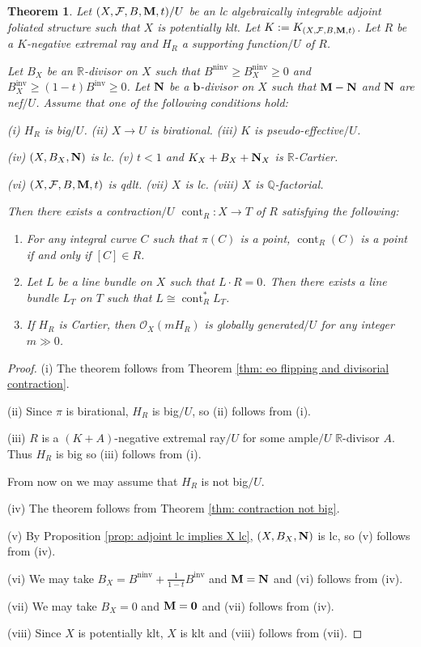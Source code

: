 \documentclass[12pt]{amsart}
\numberwithin{equation}{section}
\newcommand{\bb}{\bm{b}}
\newcommand{\Mm}{{\bf{M}}}
\newcommand{\Nn}{{\bf{N}}}
\newcommand{\Qq}{\mathbb{Q}}
\newcommand{\Rr}{\mathbb{R}}
\newcommand{\ninv}{\operatorname{ninv}}
\newcommand{\inv}{\operatorname{inv}}
\newcommand{\cont}{\operatorname{cont}}
\newcommand{\Ff}{\mathcal{F}}
\newtheorem{thm}{Theorem}[section]
\theoremstyle{definition}
\theoremstyle{definition}
\theoremstyle{definition}
\begin{document}
\begin{thm}\label{thm: contraction theorem strong}
    Let $(X,\Ff,B,\Mm,t)/U$ be an lc algebraically integrable adjoint foliated structure such that $X$ is potentially klt. Let $K:=K_{(X,\Ff,B,\Mm,t)}$. Let $R$ be a $K$-negative extremal ray and $H_R$ a supporting function$/U$ of $R$. 
    
    Let $B_X$ be an $\Rr$-divisor on $X$ such that $B^{\ninv}\geq B_X^{\ninv}\geq 0$ and $B_X^{\inv}\geq (1-t)B^{\inv}\geq 0$. Let $\Nn$ be a $\bb$-divisor on $X$ such that $\Mm-\Nn$ and $\Nn$ are nef$/U$. Assume that one of the following conditions hold:

(i) $H_R$ is big$/U$. (ii) $X\rightarrow U$ is birational. (iii) $K$ is pseudo-effective$/U$. 

(iv) $(X,B_X,\Nn)$ is lc. (v) $t<1$ and $K_X+B_X+\Nn_X$ is $\Rr$-Cartier.  

(vi) $(X,\Ff,B,\Mm,t)$ is qdlt. (vii) $X$ is lc. (viii) $X$ is $\Qq$-factorial. 

\noindent Then there exists a contraction$/U$ $\cont_R: X\rightarrow T$ of $R$ satisfying the following:
\begin{enumerate}
    \item For any integral curve $C$ such that $\pi(C)$ is a point, $\cont_R(C)$ is a point if and only if $[C]\in R$.
    \item Let $L$ be a line bundle on $X$ such that $L\cdot R=0$. Then there exists a line bundle $L_T$ on $T$ such that $L\cong \cont_R^\ast L_T$.
    \item If $H_R$ is Cartier, then $\mathcal{O}_X(mH_R)$ is globally generated$/U$ for any integer $m\gg 0$.
    \end{enumerate}
\end{thm}
\begin{proof}
(i) The theorem follows from Theorem \ref{thm: eo flipping and divisorial contraction}. 

(ii) Since $\pi$ is birational, $H_R$ is big$/U$, so (ii) follows from (i). 

(iii) $R$ is a $(K+A)$-negative extremal ray$/U$ for some ample$/U$ $\Rr$-divisor $A$. Thus $H_R$ is big so (iii) follows from (i).

From now on we may assume that $H_R$ is not big$/U$.

(iv) The theorem follows from Theorem \ref{thm: contraction not big}.

(v) By Proposition \ref{prop: adjoint lc implies X lc}, $(X,B_X,\Nn)$ is lc, so (v) follows from (iv).

(vi) We may take $B_X=B^{\ninv}+\frac{1}{1-t}B^{\inv}$ and $\Mm=\Nn$ and (vi) follows from (iv).

(vii) We may take $B_X=0$ and $\Mm=\bm{0}$ and (vii) follows from (iv).

(viii) Since $X$ is potentially klt, $X$ is klt and (viii) follows from (vii).
\end{proof}
\end{document}
